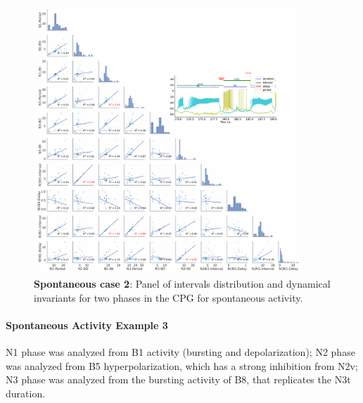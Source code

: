 \begin{figure}[htbp]
	\centering
	\includegraphics[width=0.9\textwidth]{./invariants/data/SUSSEX/prep3/images/2phases/panel_with_pairplot.pdf}
	\caption{\textbf{Spontaneous case 2}: Panel of intervals distribution and dynamical invariants for two phases in the CPG for spontaneous activity.}
	\label{fig:prep3 2phases invariants pairplot}
\end{figure}

%


\paragraph{Spontaneous Activity Example 3}
N1 phase was analyzed from B1 activity (bursting and depolarization); N2 phase was analyzed from B5 hyperpolarization, which has a strong inhibition from N2v; N3 phase was analyzed from the bursting activity of B8, that replicates the N3t duration. 

